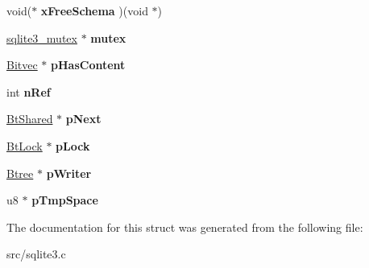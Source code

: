 \begin{DoxyCompactItemize}
\item 
\hypertarget{struct_bt_shared_a7c4816c63acea30ed44ffc58b468463e}{void($\ast$ {\bfseries x\-Free\-Schema} )(void $\ast$)}\label{struct_bt_shared_a7c4816c63acea30ed44ffc58b468463e}

\item 
\hypertarget{struct_bt_shared_a454c31d726220bbed43c165e370460c8}{\hyperlink{structsqlite3__mutex}{sqlite3\-\_\-mutex} $\ast$ {\bfseries mutex}}\label{struct_bt_shared_a454c31d726220bbed43c165e370460c8}

\item 
\hypertarget{struct_bt_shared_ace6191dc3f48f9575d7946ab8cf5b919}{\hyperlink{struct_bitvec}{Bitvec} $\ast$ {\bfseries p\-Has\-Content}}\label{struct_bt_shared_ace6191dc3f48f9575d7946ab8cf5b919}

\item 
\hypertarget{struct_bt_shared_a43d0226fa08d7fae5f992f3a2d72cc08}{int {\bfseries n\-Ref}}\label{struct_bt_shared_a43d0226fa08d7fae5f992f3a2d72cc08}

\item 
\hypertarget{struct_bt_shared_aaa9dd5c5d4ec2bb79ebe4b37ee926ae3}{\hyperlink{struct_bt_shared}{Bt\-Shared} $\ast$ {\bfseries p\-Next}}\label{struct_bt_shared_aaa9dd5c5d4ec2bb79ebe4b37ee926ae3}

\item 
\hypertarget{struct_bt_shared_af58c79eec88f99ed5a07d8cabf8a1d1a}{\hyperlink{struct_bt_lock}{Bt\-Lock} $\ast$ {\bfseries p\-Lock}}\label{struct_bt_shared_af58c79eec88f99ed5a07d8cabf8a1d1a}

\item 
\hypertarget{struct_bt_shared_ad8b2679e54027d58a3be3afcca4df1d6}{\hyperlink{struct_btree}{Btree} $\ast$ {\bfseries p\-Writer}}\label{struct_bt_shared_ad8b2679e54027d58a3be3afcca4df1d6}

\item 
\hypertarget{struct_bt_shared_a89102c20327da8a304f7e95af557bdf4}{u8 $\ast$ {\bfseries p\-Tmp\-Space}}\label{struct_bt_shared_a89102c20327da8a304f7e95af557bdf4}

\end{DoxyCompactItemize}


The documentation for this struct was generated from the following file\-:\begin{DoxyCompactItemize}
\item 
src/sqlite3.\-c\end{DoxyCompactItemize}
